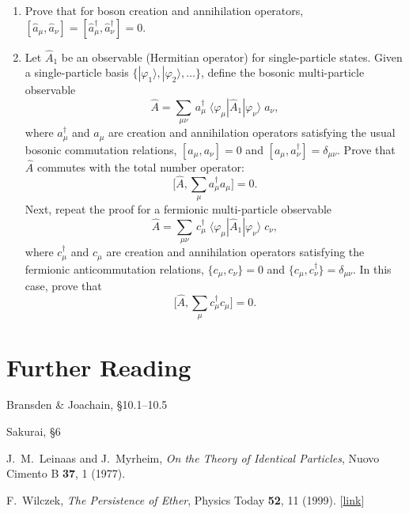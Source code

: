 \documentclass[pra,12pt]{revtex4}
\begin{document}
\begin{enumerate}
\item
  Prove that for boson creation and annihilation operators, $[\hat{a}_\mu,\hat{a}_\nu] = [\hat{a}_\mu^\dagger,\hat{a}_\nu^\dagger] = 0$.
  \label{ex:boson_commutators}

\item
  Let $\hat{A}_1$ be an observable (Hermitian operator) for
  single-particle states.  Given a single-particle basis
  $\{|\varphi_1\rangle,|\varphi_2\rangle,\dots\}$, define the
  bosonic multi-particle observable
  \begin{equation}
    \hat{A} = \sum_{\mu\nu} \,a^\dagger_\mu \; \langle\varphi_\mu|\hat{A}_1|\varphi_\nu\rangle \; a_\nu,
  \end{equation}
  where $a_\mu^\dagger$ and $a_\mu$ are creation and annihilation
  operators satisfying the usual bosonic commutation relations,
  $[a_\mu,a_\nu] = 0$ and $[a_\mu,a_\nu^\dagger] = \delta_{\mu\nu}$.
  Prove that $\hat{A}$ commutes with the total number operator:
  \begin{equation}
    \Big[\hat{A}, \sum_\mu a^\dagger_\mu a_\mu \Big] = 0.
  \end{equation}
  Next, repeat the proof for a fermionic multi-particle observable
  \begin{equation}
    \hat{A} = \sum_{\mu\nu} \,c^\dagger_\mu \; \langle\varphi_\mu|\hat{A}_1|\varphi_\nu\rangle \; c_\nu,
  \end{equation}
  where $c_\mu^\dagger$ and $c_\mu$ are creation and annihilation
  operators satisfying the fermionic anticommutation relations,
  $\{c_\mu,c_\nu\} = 0$ and $\{c_\mu,c_\nu^\dagger\} = \delta_{\mu\nu}$.
  In this case, prove that
  \begin{equation}
    \Big[\hat{A}, \sum_\mu c^\dagger_\mu c_\mu \Big] = 0.
  \end{equation}
  \label{ex:n_conserved}

\end{enumerate}

\section*{Further Reading}

\begin{enumerate}[[1{]}]
\item Bransden \& Joachain, \S10.1--10.5

\item Sakurai, \S6

\item J.~M.~Leinaas and J.~Myrheim, \textit{On the Theory of Identical Particles}, Nuovo Cimento B \textbf{37}, 1 (1977).
  \label{cite:leinaas}
  
\item F.~Wilczek, \textit{The Persistence of Ether}, Physics Today
  \textbf{52}, 11 (1999). [\href{http://physicstoday.scitation.org/doi/10.1063/1.882562}{link}]
\label{cite:wilczek}
\end{enumerate}
\end{document}
